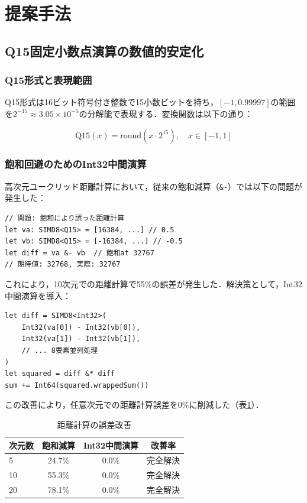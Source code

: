 \documentclass[paper]{ieice}
\begin{document}
\section{提案手法}

\subsection{Q15固定小数点演算の数値的安定化}

\subsubsection{Q15形式と表現範囲}
Q15形式は16ビット符号付き整数で15小数ビットを持ち，$[-1, 0.99997]$の範囲を$2^{-15} \approx 3.05 \times 10^{-5}$の分解能で表現する．変換関数は以下の通り：

\begin{equation}
\text{Q15}(x) = \text{round}(x \cdot 2^{15}), \quad x \in [-1, 1]
\end{equation}

\subsubsection{飽和回避のためのInt32中間演算}
高次元ユークリッド距離計算において，従来の飽和減算（\verb|&-|）では以下の問題が発生した：

\begin{lstlisting}[caption=飽和問題の発生例]
// 問題: 飽和により誤った距離計算
let va: SIMD8<Q15> = [16384, ...] // 0.5
let vb: SIMD8<Q15> = [-16384, ...] // -0.5
let diff = va &- vb  // 飽和at 32767
// 期待値: 32768, 実際: 32767
\end{lstlisting}

これにより，10次元での距離計算で55\%の誤差が発生した．解決策として，Int32中間演算を導入：

\begin{lstlisting}[caption=Int32中間演算による解決]
let diff = SIMD8<Int32>(
    Int32(va[0]) - Int32(vb[0]),
    Int32(va[1]) - Int32(vb[1]),
    // ... 8要素並列処理
)
let squared = diff &* diff
sum += Int64(squared.wrappedSum())
\end{lstlisting}

この改善により，任意次元での距離計算誤差を0\%に削減した（表\ref{tab:distance_error}）．

\begin{table}[t]
\caption{距離計算の誤差改善}
\label{tab:distance_error}
\centering
\begin{tabular}{lccc}
\toprule
次元数 & 飽和減算 & Int32中間演算 & 改善率 \\
\midrule
5 & 24.7\% & 0.0\% & 完全解決 \\
10 & 55.3\% & 0.0\% & 完全解決 \\
20 & 78.1\% & 0.0\% & 完全解決 \\
\bottomrule
\end{tabular}
\end{table}
\end{document}
